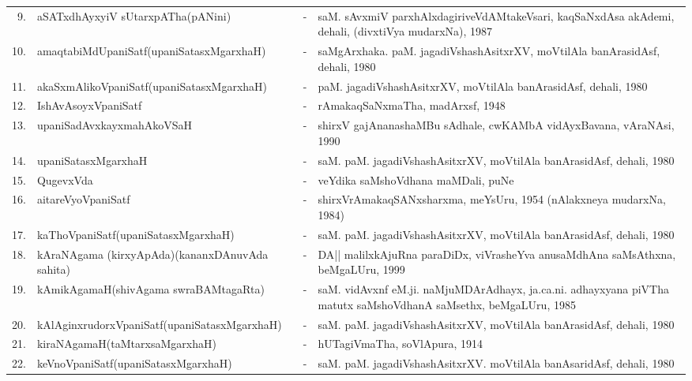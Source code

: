 {\begin{longtable}{rp{6cm}cp{9cm}<{\raggedright}}
9. & aSATxdhAyxyiV sUtarxpATha\newline (pANini) &-& saM. sAvxmiV parxhAlxdagiriveVdAMtakeVsari, kaqSaNxdAsa akAdemi, dehali, (divxtiVya mudarxNa), 1987\\
10. & amaqtabiMdUpaniSatf\newline (upaniSatasxMgarxhaH) &-& saMgArxhaka. paM. jagadiVshashAsitxrXV, moVtilAla banArasidAsf, dehali, 1980\\
11. & akaSxmAlikoVpaniSatf\newline (upaniSatasxMgarxhaH) &-& paM. jagadiVshashAsitxrXV, moVtilAla banArasidAsf, dehali, 1980\\
12. & IshAvAsoyxVpaniSatf &-& rAmakaqSaNxmaTha, madArxsf, 1948\\
13. & upaniSadAvxkayxmahAkoVSaH &-& shirxV gajAnanashaMBu sAdhale, cwKAMbA vidAyxBavana, vAraNAsi, 1990\\
14. & upaniSatasxMgarxhaH &-& saM. paM. jagadiVshashAsitxrXV, moVtilAla banArasidAsf, dehali, 1980\\
15. & QugevxVda &-& veYdika saMshoVdhana maMDali, puNe\\
16. & aitareVyoVpaniSatf &-& shirxVrAmakaqSANxsharxma, meYsUru, 1954 (nAlakxneya mudarxNa, 1984)\\
17. & kaThoVpaniSatf\newline (upaniSatasxMgarxhaH) &-& saM. paM. jagadiVshashAsitxrXV, moVtilAla banArasidAsf, dehali, 1980\\
18. & kAraNAgama (kirxyApAda)\newline (kananxDAnuvAda sahita) &-& DA|| malilxkAjuRna paraDiDx, viVrasheYva anusaMdhAna saMsAthxna, beMgaLUru, 1999\\
19. & kAmikAgamaH\newline (shivAgama swraBAMtagaRta) &-& saM. vidAvxnf eM.ji. naMjuMDArAdhayx, ja.ca.ni. adhayxyana piVTha matutx saMshoVdhanA saMsethx, beMgaLUru, 1985\\
20. & kAlAginxrudorxVpaniSatf\newline (upaniSatasxMgarxhaH) &-& saM. paM. jagadiVshashAsitxrXV, moVtilAla banArasidAsf, dehali, 1980\\
21. & kiraNAgamaH\newline (taMtarxsaMgarxhaH) &-& hUTagiVmaTha, soVlApura, 1914\\
22. & keVnoVpaniSatf\newline (upaniSatasxMgarxhaH) &-& saM. paM. jagadiVshashAsitxrXV. moVtilAla banAsaridAsf, dehali, 1980\\

\end{longtable}}
